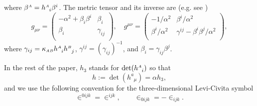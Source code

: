 \documentclass[
10pt, %
a4paper, %
oneside, %
headinclude,footinclude, %
BCOR5mm, %
]{scrartcl}
\newcommand{\IP}[1]{{\color{Red}[IP:\ \ #1]}}
\newcommand{\sA}{\mathsmaller A}
\newcommand{\sB}{\mathsmaller B}
\newcommand{\tetrsymbol}{h}
\newcommand{\tetr}[2]{\tetrsymbol^{#1}_{\phantom{#1}#2}}
\newcommand{\detTetr}{\tetrsymbol}
\newcommand{\ET}[2]{E^{#1}_{\phantom{#1}#2}}	%
\newcommand{\Dm}[2]{D_{\phantom{#2}#1}^{#2}}	%
\newcommand{\aD}[2]{\mathcal{D}_{\phantom{#2}#1}^{#2}}	%
\newcommand{\BT}[2]{B^{#1#2}}	%
\newcommand{\Bm}[2]{B^{#1#2}}	%
\newcommand{\aB}[2]{\mathcal{B}^{#1#2}}	%
\newcommand{\hT}[2]{H_{#1#2}}	%
\newcommand{\LagBE}{\mathcal{L}}%
\newcommand{\Um}{U}%
\newcommand{\LCsymb}{\bm{\in}}    %
\begin{document}
where $ \beta^{\sA} = \tetr{\sA}{i}\beta^i$.
The metric tensor and its inverse are (e.g. see \cite{Gourgoulhon2012a})
\begin{equation}
	g_{\mu\nu} = \left(
	\begin{array}{cc}
		-\alpha^2 + \beta_i\beta^i & \beta_i \\[1mm]
		\beta_i & \gamma_{ij}  \\
	\end{array}
	\right) ,
	\quad
	g^{\mu\nu} = \left(
	\begin{array}{cc}
		-1/\alpha^2       & \beta^i/\alpha^2 \\[1mm]
		\beta^{i}/\alpha^2 & \gamma^{ij} - \beta^i\beta^j/\alpha^2  \\
	\end{array}
	\right) ,
\end{equation}
where $ \gamma_{ij} = \kappa_{\sA\sB} \tetr{\sA}{i}\tetr{\sB}{j}$, $ 
\gamma^{ij} = \left( \gamma_{ij} \right)^{-1}  $, and $ \beta_i =  \gamma_{ij}\beta^j$.

In the rest of the paper, $ \detTetr_3 $ stands for $ \det(\tetr{\sA}{i}) $ so that
\begin{equation}\label{eqn.det}
	\detTetr := \det(\tetr{a}{\mu}) = \alpha \detTetr_3,
\end{equation}
and we use the following convention for the three-dimensional Levi-Civita symbol
\begin{equation}\label{eqn.LC.3d}
	\LCsymb^{0ijk} = \LCsymb^{ijk}, 
	\qquad
	\LCsymb_{0ijk} =-\LCsymb_{ijk}.
\end{equation}




%
\end{document}
